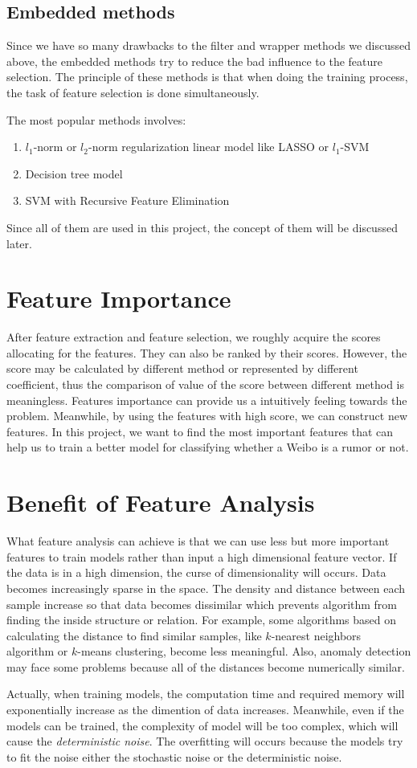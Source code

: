 \subsection{Embedded methods}
Since we have so many drawbacks to the filter and wrapper methods we discussed above, the embedded methods try to reduce the bad influence to the feature selection. The principle of these methods is that when doing the training process, the task of feature selection is done simultaneously.

The most popular methods involves:
\begin{enumerate} \item $l_1$-norm or $l_2$-norm regularization linear model like LASSO or $l_1$-SVM \item Decision tree model \item SVM with Recursive Feature Elimination
\end{enumerate}
Since all of them are used in this project, the concept of them will be discussed later.
\section{Feature Importance}
After feature extraction and feature selection, we roughly acquire the scores allocating for the features. They can also be ranked by their scores. However, the score may be calculated by different method or represented by different coefficient, thus the comparison of value of the score between different method is meaningless. Features importance can provide us a intuitively feeling towards the problem. Meanwhile, by using the features with high score, we can construct new features. In this project, we want to find the most important features that can help us to train a better model for classifying whether a Weibo is a rumor or not.
\section{Benefit of Feature Analysis}
What feature analysis can achieve is that we can use less but more important features to train models rather than input a high dimensional feature vector. If the data is in a high dimension, the curse of dimensionality will occurs. Data becomes increasingly sparse in the space. The density and distance between each sample increase so that data becomes dissimilar which prevents algorithm from finding the inside structure or relation. For example, some algorithms based on calculating the distance to find similar samples, like $k$-nearest neighbors algorithm\cite{altman1992introduction} or $k$-means clustering\cite{hartigan1979algorithm}, become less meaningful. Also, anomaly detection may face some problems because all of the distances become numerically similar\cite{zimek2012survey}.

Actually, when training models, the computation time and required memory will exponentially increase as the dimention of data increases. Meanwhile, even if the models can be trained, the complexity of model will be too complex, which will cause the \textit{deterministic noise}\cite{abu2012learning}. The overfitting will occurs because the models try to fit the noise either the stochastic noise or the deterministic noise.
